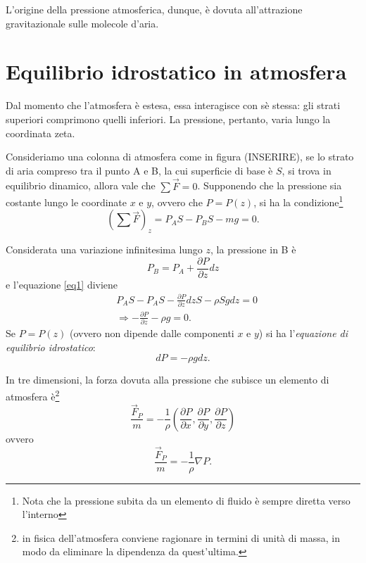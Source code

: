 L'origine della pressione atmosferica, dunque, è dovuta all'attrazione gravitazionale sulle molecole d'aria. 
\section{Equilibrio idrostatico in atmosfera}
Dal momento che l'atmosfera è estesa, essa interagisce con sè stessa: gli strati superiori comprimono quelli inferiori. La pressione, pertanto, varia lungo la coordinata zeta. 

Consideriamo una colonna di atmosfera come in figura (INSERIRE), se lo strato di aria compreso tra il punto A e B, la cui superficie di base è $S$, si trova in equilibrio dinamico, allora vale che $\sum\vec{F}=0$. Supponendo che la pressione sia costante lungo le coordinate $x$ e $y$, ovvero che $P=P(z)$, si ha la condizione\footnote{Nota che la pressione subita da un elemento di fluido è sempre diretta verso l'interno}
\begin{equation}\label{eq1}
	(\sum\vec{F})_z=P_A S - P_B S -mg =0.
\end{equation}

Considerata una variazione infinitesima lungo $z$, la pressione in B è 
\begin{equation}
	P_B=P_A+\frac{\partial P}{\partial z}dz
\end{equation}
e l'equazione \eqref{eq1} diviene
\begin{align}
	&P_A S - P_A S -\frac{\partial P}{\partial z}dzS -\rho S g dz=0\\
	&\Rightarrow -\frac{\partial P}{\partial z}-\rho g =0.
\end{align}
Se $P=P(z)$ (ovvero non dipende dalle componenti $x$ e $y$) si ha l'\emph{equazione di equilibrio idrostatico}:
\begin{equation}\label{idro}
	\boxed{dP=-\rho g dz}.
\end{equation}

In tre dimensioni, la forza dovuta alla pressione che subisce un elemento di atmosfera è\footnote{in fisica dell'atmosfera conviene ragionare in termini di unità di massa, in modo da eliminare la dipendenza da quest'ultima.}
\begin{equation}
	\frac{\vec{F}_P}{m}=-\frac{1}{\rho}\left(\frac{\partial P}{\partial x},\frac{\partial P}{\partial y}, \frac{\partial P}{\partial z}\right)
\end{equation}
ovvero
\begin{equation}
	\frac{\vec{F}_P}{m}=-\frac{1}{\rho}\nabla P.
\end{equation}

